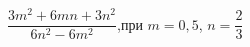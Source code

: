 \begin{ex}[type=expr_calc]
	\begin{condition}
		\( \dfrac{3m^2+6mn+3n^2}{6n^2-6m^2} \),\quad при \( m=0,5 \), \( n=\dfrac{2}{3} \)
	\end{condition}
\end{ex}